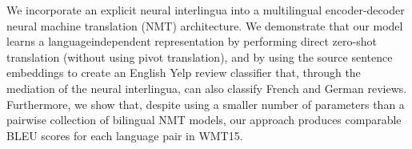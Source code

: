 We incorporate an explicit neural interlingua into a multilingual encoder-decoder neural machine translation (NMT) architecture. We demonstrate that our model learns a languageindependent representation by performing direct zero-shot translation (without using pivot translation), and by using the source sentence embeddings to create an English Yelp review classifier that, through the mediation of the neural interlingua, can also classify French and German reviews. Furthermore, we show that, despite using a smaller number of parameters than a pairwise collection of bilingual NMT models, our approach produces comparable BLEU scores for each language pair in WMT15.
